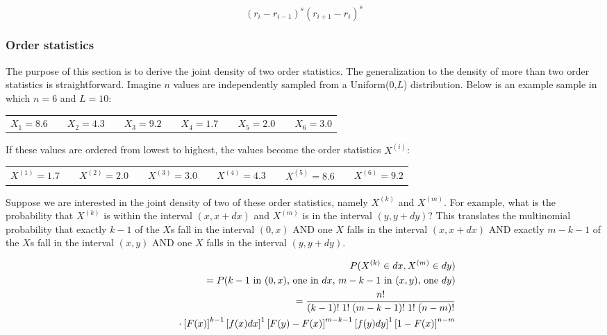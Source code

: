 \documentclass[12pt]{article}
\begin{document}
\[ (r_i - r_{i-1})^s (r_{i+1} - r_i)^s \]

\subsubsection{Order statistics}

The purpose of this section is to derive the joint density of two order statistics. The generalization to the density of more than two order statistics is straightforward. Imagine $n$ values are independently sampled from a Uniform(0,$L$) distribution. Below is an example sample in which $n=6$ and $L=10$:

\begin{center}
\begin{tabular}{ccccccccccc}
$X_1 = 8.6$ & & $X_2 = 4.3$ & & $X_3 = 9.2$ & & $X_4 = 1.7$ & & $X_5 = 2.0$ & & $X_6 = 3.0$
\end{tabular} 
\end{center}

If these values are ordered from lowest to highest, the values become the order statistics $X^{(i)}$:
          
\begin{center}
\begin{tabular}{ccccccccccc}
$X^{(1)} = 1.7$ & & $X^{(2)} = 2.0$ & & $X^{(3)} = 3.0$ & & $X^{(4)} = 4.3$ & & $X^{(5)} = 8.6$ & & $X^{(6)} = 9.2$
\end{tabular} 
\end{center}

Suppose we are interested in the joint density of two of these order statistics, namely $X^{(k)}$ and $X^{(m)}$. For example, what is the probability that $X^{(k)}$ is within the interval $(x, x+dx)$ and $X^{(m)} $ is in the interval $(y, y+dy)$? This translates the multinomial probability that exactly $k-1$ of the $X$s fall in the interval $(0,x)$ AND one $X$ falls in the interval $(x,x+dx)$ AND exactly $m-k-1$ of the $X$s fall in the interval $(x,y)$ AND one $X$ falls in the interval $(y,y+dy)$.

\begin{eqnarray*}
& &P(X^{(k)} \in dx, X^{(m)} \in dy) \\
& & = P(\mbox{$k-1$ in $(0,x)$, one in $dx$, $m-k-1$ in $(x,y)$, one $dy$}) \\
& & = \frac{n!}{(k-1)! \; 1! \; (m-k-1)! \; 1! \; (n-m)!} \\
& & \rule{.2in}{0.in} \cdot
      \left[ F(x) \right]^{k-1}
      \left[ f(x) dx \right]^{1}
      \left[ F(y) - F(x) \right]^{m-k-1}
      \left[ f(y) dy \right]^{1}
      \left[ 1 - F(x) \right]^{n-m}
\end{eqnarray*}
\end{document}

